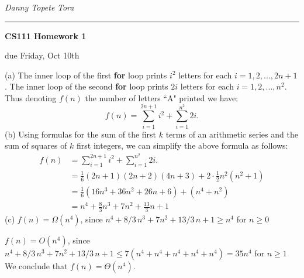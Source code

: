 \documentclass[11pt]{article}
\newcommand{\student}[1]{{\noindent\Large\em {#1} \hfill}\vskip 0.1in}
\newcommand{\assignment}[1]{\centerline{\large\bf CS111 Homework {#1}}}
\newcommand{\duedate}[1]{{\centerline{due {#1}}}}
\newcounter{prnum}
\newenvironment{problem}{{\vskip 0.2in\noindent\bf Problem
       \addtocounter{prnum}{1} \arabic{prnum}.}}{\vskip 0.1in}
\begin{document}
\student{Danny Topete} %
\student{Tora} %
\vskip 0.1in\noindent\hrule\vskip 0.2in
\assignment{1}                           %
\duedate{Friday, Oct 10th}              %


\begin{problem}
\noindent(a)
The inner loop of the first \textbf{for} loop prints $i^2$ letters for each $i = 1,2,...,2n+1$. The inner loop of the second \textbf{for} loop prints $2i$ letters for each $i = 1,2,...,n^2$.
Thus denoting $f(n)$ the number of letters ``A" printed we have:
\begin{equation*}
    f(n) = \sum_{i=1}^{2n+1} i^2 + \sum_{i=1}^{n^2}2i.
\end{equation*}
%
\noindent (b)
Using formulas for the sum of the first $k$ terms of an arithmetic series and the sum of squares of $k$ first integers, we can simplify the above formula as follows:
%
\begin{align*}
    f(n) &= \sum_{i=1}^{2n+1} i^2 + \sum_{i=1}^{n^2}2i.
    \\
    &= \frac16 (2n+1)(2n+2)(4n+3) + 2 \cdot \frac12 n^2(n^2+1)
    \\
    &= \frac16 (16n^3+36n^2+26n+6) + (n^4+n^2)
    \\
    &= n^4 + \frac83 n^3 + 7n^2+ \frac{13}{3}n + 1
\end{align*}
%
\noindent (c)
$f(n) = \Omega(n^4)$, since $n^4 + 8/3 \, n^3 + 7n^2+ 13/3 \, n + 1 \geq n^4$ for $n \ge 0$

$f(n) = O(n^4)$, since
$n^4 + 8/3 \, n^3 + 7n^2+ 13/3 \, n + 1 \leq 7(n^4 + n^4 +n^4 +n^4 + n^4) = 35 n^4$ for $n \ge 1$\\
We conclude that $f(n) = \Theta(n^4)$.
\end{problem}
\end{document}
